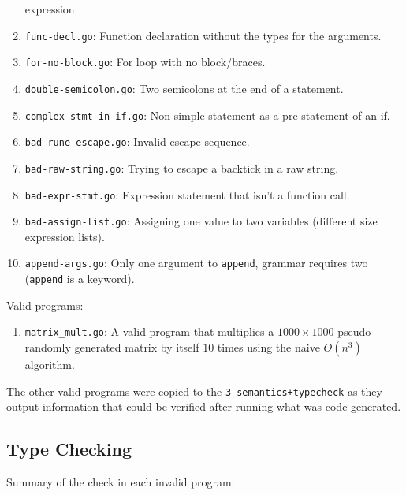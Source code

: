 \documentclass[11pt]{article}
\begin{document}
\begin{enumerate}
  expression.
\item \texttt{func-decl.go}: Function declaration without the types
  for the arguments.
\item \texttt{for-no-block.go}: For loop with no block/braces.
\item \texttt{double-semicolon.go}: Two semicolons at the end of a
  statement.
\item \texttt{complex-stmt-in-if.go}: Non simple statement as a
  pre-statement of an if.
\item \texttt{bad-rune-escape.go}: Invalid escape sequence.
\item \texttt{bad-raw-string.go}: Trying to escape a backtick in a raw
  string.
\item \texttt{bad-expr-stmt.go}: Expression statement that isn't a
  function call.
\item \texttt{bad-assign-list.go}: Assigning one value to two
  variables (different size expression lists).
\item \texttt{append-args.go}: Only one argument to \texttt{append},
  grammar requires two (\texttt{append} is a keyword).
\end{enumerate}
Valid programs:
\begin{enumerate}
\item \texttt{matrix\_mult.go}: A valid program that multiplies a $1000
  \times 1000$ pseudo-randomly generated matrix by itself $10$ times
  using the naive $O(n^3)$ algorithm.
\end{enumerate}
The other valid programs were copied to the
\texttt{3-semantics+typecheck} as they output information that could
be verified after running what was code generated.

\subsection{Type Checking}
\label{sec:atypecheck}

Summary of the check in each invalid program:
\end{document}
